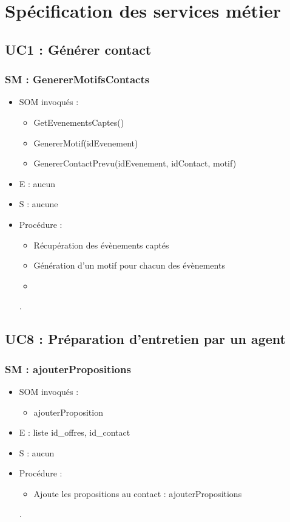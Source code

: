 
\section{Spécification des services métier}
\subsection{UC1 : Générer contact}
\subsubsection{SM : GenererMotifsContacts}
\begin{itemize}
\item SOM invoqués :
\begin{itemize}
\item GetEvenementsCaptes()
\item GenererMotif(idEvenement)
\item GenererContactPrevu(idEvenement, idContact, motif)
\end{itemize}
\item E : aucun
\item S : aucune
\item Procédure :
\begin{itemize}
\item Récupération des évènements captés
\item Génération d’un motif pour chacun des évènements
\item
\end{itemize}.
\end{itemize}
\subsection{UC8 : Préparation d’entretien par un agent}
\subsubsection{SM : ajouterPropositions}
\begin{itemize}
\item SOM invoqués :
\begin{itemize}
\item ajouterProposition
\end{itemize}
\item E : liste id\_offres, id\_contact
\item S : aucun
\item Procédure :
\begin{itemize}
\item Ajoute les propositions au contact : ajouterPropositions
\end{itemize}.
\end{itemize}
